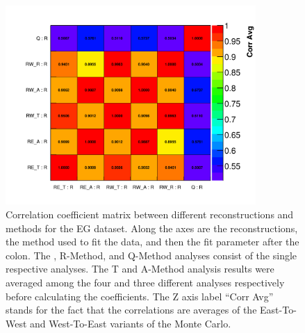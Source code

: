 \begin{figure}
\centering
\includegraphics[width=0.85\textwidth]{Avg_Recon_CorrelationMatrix_R_R}
\caption{Correlation coefficient matrix between different reconstructions and methods for the EG dataset. Along the axes are the reconstructions, the method used to fit the data, and then the fit parameter after the colon. The \RE, R-Method, and Q-Method analyses consist of the single respective analyses. The \RW T and A-Method analysis results were averaged among the four and three different analyses respectively before calculating the coefficients. The Z axis label ``Corr Avg'' stands for the fact that the correlations are averages of the East-To-West and West-To-East variants of the Monte Carlo.}
\label{fig:corrMatRecon}
\end{figure}





